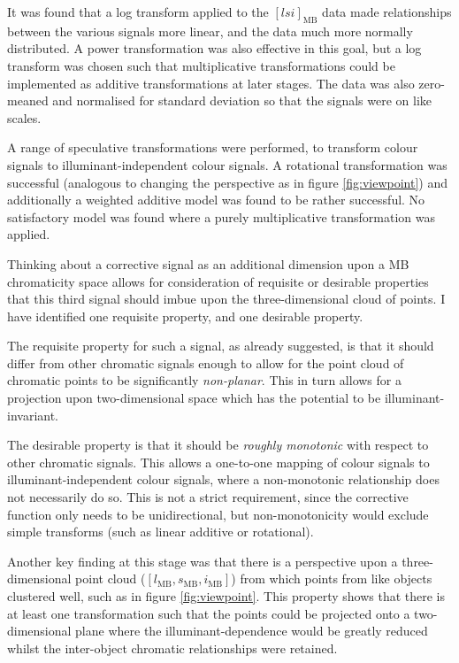 It was found that a log transform applied to the $[lsi]_{\text{MB}}$ data made relationships between the various signals more linear, and the data much more normally distributed. A power transformation was also effective in this goal, but a log transform was chosen such that multiplicative transformations could be implemented as additive transformations at later stages. The data was also zero-meaned and normalised for standard deviation so that the signals were on like scales.

A range of speculative transformations were performed, to transform colour signals to illuminant-independent colour signals. A rotational transformation was successful (analogous to changing the perspective as in figure \ref{fig:viewpoint}) and additionally a weighted additive model was found to be rather successful. No satisfactory model was found where a purely multiplicative transformation was applied.

Thinking about a corrective signal as an additional dimension upon a \gls{MB} chromaticity space allows for consideration of requisite or desirable properties that this third signal should imbue upon the three-dimensional cloud of points. I have identified one requisite property, and one desirable property. 

The requisite property for such a signal, as already suggested, is that it should differ from other chromatic signals enough to allow for the point cloud of chromatic points to be significantly \emph{non-planar}. This in turn allows for a projection upon two-dimensional space which has the potential to be illuminant-invariant.

The desirable property is that it should be \emph{roughly monotonic} with respect to other chromatic signals. This allows a one-to-one mapping of colour signals to illuminant-independent colour signals, where a non-monotonic relationship does not necessarily do so. This is not a strict requirement, since the corrective function only needs to be unidirectional, but non-monotonicity would exclude simple transforms (such as linear additive or rotational).

Another key finding at this stage was that there is a perspective upon a three-dimensional point cloud ($[l_{\text{MB}},s_{\text{MB}},i_{\text{MB}}]$) from which points from like objects clustered well, such as in figure \ref{fig:viewpoint}. This property shows that there is at least one transformation such that the points could be projected onto a two-dimensional plane where the illuminant-dependence would be greatly reduced whilst the inter-object chromatic relationships were retained. 

